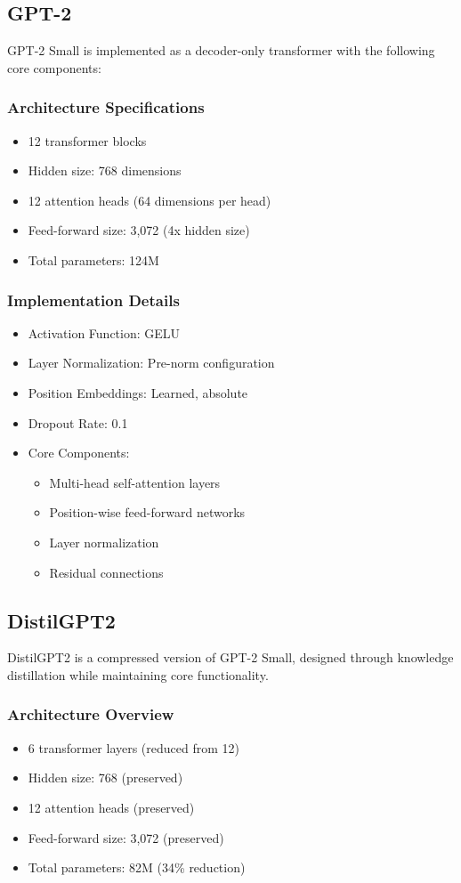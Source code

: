 \documentclass[11pt]{article}
\begin{document}
\subsection{GPT-2}
GPT-2 Small is implemented as a decoder-only transformer with the following core components:

\subsubsection{Architecture Specifications}
\begin{itemize}
  \item 12 transformer blocks
  \item Hidden size: 768 dimensions
  \item 12 attention heads (64 dimensions per head)
  \item Feed-forward size: 3,072 (4x hidden size)
  \item Total parameters: 124M
\end{itemize}

\subsubsection{Implementation Details}
\begin{itemize}
  \item Activation Function: GELU
  \item Layer Normalization: Pre-norm configuration
  \item Position Embeddings: Learned, absolute
  \item Dropout Rate: 0.1
  \item Core Components:
    \begin{itemize}
      \item Multi-head self-attention layers
      \item Position-wise feed-forward networks
      \item Layer normalization
      \item Residual connections
    \end{itemize}
\end{itemize}

\subsection{DistilGPT2}
DistilGPT2 is a compressed version of GPT-2 Small, designed through knowledge distillation while maintaining core functionality.

\subsubsection{Architecture Overview}
\begin{itemize}
  \item 6 transformer layers (reduced from 12)
  \item Hidden size: 768 (preserved)
  \item 12 attention heads (preserved)
  \item Feed-forward size: 3,072 (preserved)
  \item Total parameters: 82M (34\% reduction)
\end{itemize}
\end{document}
